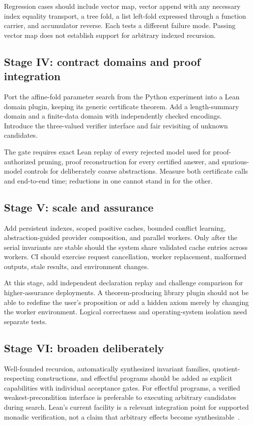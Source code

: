 Regression cases should include vector map, vector append with any necessary index equality transport, a tree fold, a list left-fold expressed through a function carrier, and accumulator reverse. Each tests a different failure mode. Passing vector map does not establish support for arbitrary indexed recursion.

\subsection{Stage IV: contract domains and proof integration}
Port the affine-fold parameter search from the Python experiment into a Lean domain plugin, keeping its generic certificate theorem. Add a length-summary domain and a finite-data domain with independently checked encodings. Introduce the three-valued verifier interface and fair revisiting of unknown candidates.

The gate requires exact Lean replay of every rejected model used for proof-authorized pruning, proof reconstruction for every certified answer, and spurious-model controls for deliberately coarse abstractions. Measure both certificate calls and end-to-end time; reductions in one cannot stand in for the other.

\subsection{Stage V: scale and assurance}
Add persistent indexes, scoped positive caches, bounded conflict learning, abstraction-guided provider composition, and parallel workers. Only after the serial invariants are stable should the system share validated cache entries across workers. CI should exercise request cancellation, worker replacement, malformed outputs, stale results, and environment changes.

At this stage, add independent declaration replay and challenge comparison for higher-assurance deployments. A theorem-producing library plugin should not be able to redefine the user's proposition or add a hidden axiom merely by changing the worker environment. Logical correctness and operating-system isolation need separate tests.

\subsection{Stage VI: broaden deliberately}
Well-founded recursion, automatically synthesized invariant families, quotient-respecting constructions, and effectful programs should be added as explicit capabilities with individual acceptance gates. For effectful programs, a verified weakest-precondition interface is preferable to executing arbitrary  candidates during search. Lean's current  facility is a relevant integration point for supported monadic verification, not a claim that arbitrary effects become synthesizable~\cite{mvcgen}.

